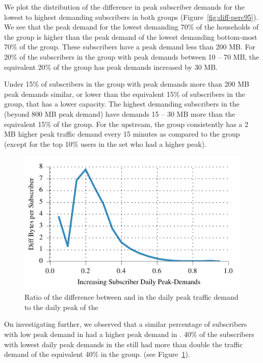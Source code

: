 We plot the distribution of the difference in peak subscriber demands for
the lowest to highest demanding subscribers in both groups (Figure~\ref{fig:diff-perc95}).
We see that the peak demand for the lowest demanding 70\% of the households of
the \treatment{} group is higher than the peak demand of the lowest demanding bottom-most
70\% of the \control{} group. These subscribers have a peak demand less than 200 MB.
For 20\% of the subscribers in the \control{} group with peak demands between 10 -- 70 MB,
the equivalent 20\% of the \treatment{} group has peak demands increased by 30 MB.

Under 15\% of subscribers in the \treatment{} group with peak demands more than 200 MB 
peak demands similar, or lower than the equivalent 15\% of subscribers in the \control{}
group, that has a lower capacity. The highest demanding subscribers in the \treatment{}
(beyond 800 MB peak demand) have demands 15 -- 30 MB more than the equivalent 15\% of 
the \control{} group. For the upstream, the \treatment{} group consistently has
a 2 MB higher peak traffic demand every 15 minutes as compared to the \control{} group
(except for the top 10\% users in the \treatment{} set who had a higher peak).

\begin{figure}[t]
\centering
\includegraphics[width=\linewidth]{figures/diff_perc95_bytes_subsc-daily-normalized.pdf}
               \caption{Ratio of the difference between \treatment{} and \control{}
               in the daily peak traffic demand to the daily peak of the \control\label{fig:daily-ratio-perc95}}
\end{figure}

On investigating further, we observed that a similar percentage of 
subscribers with low peak demand in \control{} had a higher peak demand in \treatment{}.
40\% of the subscribers with lowest daily peak demands in the \treatment{} still
had more than double the traffic demand of the equivalent 40\% in the \control{} group.
(see Figure~\ref{fig:daily-ratio-perc95}).

